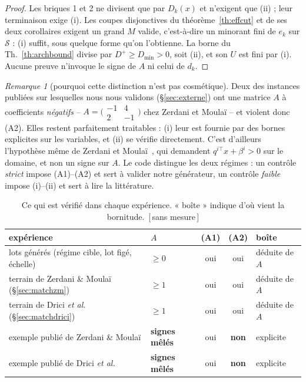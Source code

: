 \documentclass[11pt,a4paper]{article}
\theoremstyle{plain}
\theoremstyle{remark}
\newtheorem{remark}{Remarque}
\newcommand{\Dk}{D_k}
\newcommand{\Scal}{\mathcal{S}}
\newcommand{\confna}{\textsf{\footnotesize[\,sans mesure\,]}}
\begin{document}
\begin{proof}
Les briques 1 et 2 ne divisent que par $\Dk(x)$ et n'exigent que (ii) ;
leur terminaison exige (i). Les coupes disjonctives du
théorème~\ref{th:effcut} et de ses deux corollaires exigent un grand $M$ valide, c'est-à-dire un minorant fini de
$e_k$ sur $\Scal$ : (i) suffit, sous quelque forme qu'on l'obtienne. La
borne du Th.~\ref{th:archbound} divise par $D^{+}\ge D_{\min}>0$, soit (ii),
et son $U$ est fini par (i). Aucune preuve n'invoque le signe de $A$ ni
celui de $d_k$. \end{proof}

\begin{remark}[pourquoi cette distinction n'est pas cosmétique]
Deux des instances publiées sur lesquelles nous nous validons
(§\ref{sec:externe}) ont une matrice $A$ à coefficients \emph{négatifs} --
$A=\bigl(\begin{smallmatrix}-1&4\\2&-1\end{smallmatrix}\bigr)$ chez Zerdani
et Moulaï --
et violent donc (A2). Elles restent parfaitement traitables : (i) leur est
fournie par des bornes explicites sur les variables, et (ii) se vérifie
directement. C'est d'ailleurs l'hypothèse même de Zerdani et
Moulaï~\cite{zerdani2011}, qui demandent $q^{i\top}x+\beta^i>0$ sur le
domaine, et non un signe sur $A$. Le code distingue les deux régimes : un
contrôle \emph{strict} impose (A1)--(A2) et sert à valider notre générateur,
un contrôle \emph{faible} impose (i)--(ii) et sert à lire la littérature.
\end{remark}

\begin{table}[H]
\centering
\caption{Ce qui est vérifié dans chaque expérience. « boîte » indique
d'où vient la bornitude.\ \confna}
\label{tab:hyp}
\setlength{\tabcolsep}{5pt}
\begin{tabular}{llccl}
\toprule
expérience & $A$ & (A1) & (A2) & boîte\\
\midrule
lots générés (régime cible, lot figé, échelle)
 & $\ge 0$ & oui & oui & déduite de $A$\\
terrain de Zerdani \& Moulaï (§\ref{sec:matchzm})
 & $\ge 1$ & oui & oui & déduite de $A$\\
terrain de Drici \emph{et al.} (§\ref{sec:matchdrici})
 & $\ge 1$ & oui & oui & déduite de $A$\\
\midrule
exemple publié de Zerdani \& Moulaï
 & \textbf{signes mêlés} & oui & \textbf{non} & explicite\\
exemple publié de Drici \emph{et al.}
 & \textbf{signes mêlés} & oui & \textbf{non} & explicite\\
\bottomrule
\end{tabular}
\end{table}
\end{document}
